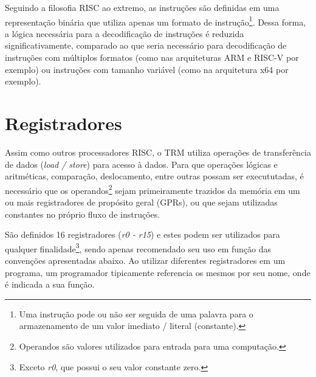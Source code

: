 \documentclass[11pt,a4paper]{report}
\begin{document}
Seguindo a filosofia RISC ao extremo, as instruções são definidas em uma
representação binária que utiliza apenas um formato de
instrução\footnote{Uma instrução pode ou não ser seguida de uma palavra
para o armazenamento de um valor imediato / literal (constante).}. Dessa
forma, a lógica necessária para a decodificação de instruções é reduzida
significativamente, comparado ao que seria necessário para decodificação
de instruções com múltiplos formatos (como nas arquiteturas ARM e RISC-V
por exemplo) ou instruções com tamanho variável (como na arquitetura x64
por exemplo).

\section{Registradores}

Assim como outros processadores RISC, o TRM utiliza operações de
transferência de dados (\textit{load / store}) para acesso à dados. Para
que operações lógicas e aritméticas, comparação, deslocamento, entre
outras possam ser execututadas, é necessário que os operandos\footnote{
Operandos são valores utilizados para entrada para uma computação.}
sejam  primeiramente trazidos da memória em um ou mais registradores de
propósito geral (GPRs), ou que sejam utilizadas constantes no próprio
fluxo de instruções.

São definidos 16 registradores (\textit{r0 - r15}) e estes podem ser
utilizados para qualquer finalidade\footnote{Exceto \textit{r0}, que
possui o seu valor constante zero.}, sendo apenas recomendado seu uso em
função das convenções apresentadas abaixo. Ao utilizar diferentes
registradores em um programa, um programador tipicamente referencia os
mesmos por seu nome, onde é indicada a sua função.
\end{document}
